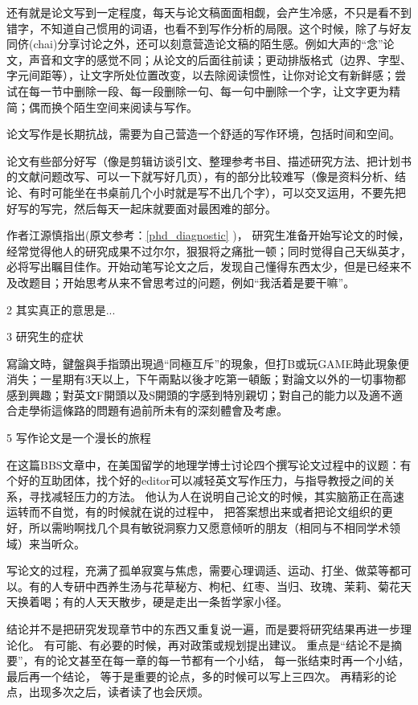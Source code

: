 还有就是论文写到一定程度，每天与论文稿面面相觑，会产生冷感，不只是看不到错字，不知道自己惯用的词语，也看不到写作分析的局限。这个时候，除了与好友同侪(chai)分享讨论之外，还可以刻意营造论文稿的陌生感。例如大声的“念”论文，声音和文字的感觉不同；从论文的后面往前读；更动排版格式（边界、字型、字元间距等），让文字所处位置改变，以去除阅读惯性，让你对论文有新鲜感；尝试在每一节中删除一段、每一段删除一句、每一句中删除一个字，让文字更为精简；偶而换个陌生空间来阅读与写作。

论文写作是长期抗战，需要为自己营造一个舒适的写作环境，包括时间和空间。

论文有些部分好写（像是剪辑访谈引文、整理参考书目、描述研究方法、把计划书的文献问题改写、可以一下就写好几页），有的部分比较难写（像是资料分析、结论、有时可能坐在书桌前几个小时就是写不出几个字），可以交叉运用，不要先把好写的写完，然后每天一起床就要面对最困难的部分。


作者江源慎指出(原文参考：\ref{phd_diagnostic} )， 研究生准备开始写论文的时候，经常觉得他人的研究成果不过尔尔，狠狠将之痛批一顿；同时觉得自己天纵英才，必将写出瞩目佳作。开始动笔写论文之后，发现自己懂得东西太少，但是已经来不及改题目；开始思考从来不曾思考过的问题，例如“我活着是要干嘛”。

2 其实真正的意思是...

3 研究生的症状

寫論文時，鍵盤與手指頭出現過“同極互斥”的現象，但打B或玩GAME時此現象便消失；一星期有3天以上，下午兩點以後才吃第一頓飯；對論文以外的一切事物都感到興趣；對英文F開頭以及S開頭的字感到特別親切；對自己的能力以及適不適合走學術這條路的問題有過前所未有的深刻體會及考慮。

5 写作论文是一个漫长的旅程

在这篇BBS文章中，在美国留学的地理学博士讨论四个撰写论文过程中的议题：有个好的互助团体，找个好的editor可以减轻英文写作压力，与指导教授之间的关系，寻找减轻压力的方法。
他认为人在说明自己论文的时候，其实脑筋正在高速运转而不自觉，有的时候就在说的过程中，
把答案想出来或者把论文组织的更好，所以需哟啊找几个具有敏锐洞察力又愿意倾听的朋友（相同与不相同学术领域）来当听众。

写论文的过程，充满了孤单寂寞与焦虑，需要心理调适、运动、打坐、做菜等都可以。有的人专研中西养生汤与花草秘方、枸杞、红枣、当归、玫瑰、茉莉、菊花天天换着喝；有的人天天散步，硬是走出一条哲学家小径。

结论并不是把研究发现章节中的东西又重复说一遍，而是要将研究结果再进一步理论化。
有可能、有必要的时候，再对政策或规划提出建议。
重点是“结论不是摘要”，有的论文甚至在每一章的每一节都有一个小结，
每一张结束时再一个小结，最后再一个结论，
等于是重要的论点，多的时候可以写上三四次。 
再精彩的论点，出现多次之后，读者读了也会厌烦。

